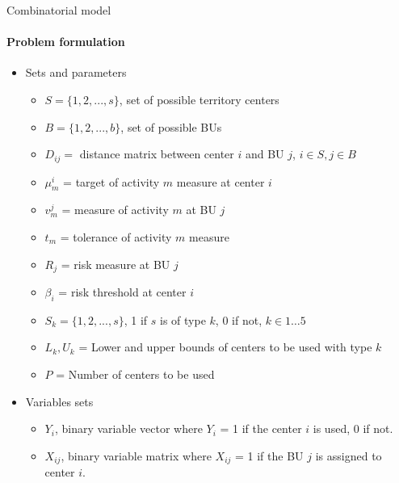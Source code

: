 \documentclass{beamer}
\begin{document}
\begin{frame}{Combinatorial model}
    \framesubtitle{Problem formulation}
    \begin{itemize}
        \item Sets and parameters
        \begin{itemize}
            \item $S = \{1, 2, ..., s\}$, set of possible territory centers
            \item $B = \{1, 2, ..., b\}$, set of possible BUs
            \item $D_{ij} = $ distance matrix between center $i$ and BU $j$, $i \in S, j \in B$
            \item $\mu_m^i$ = target of activity $m$ measure at center $i$
            \item $v_m^j$ = measure of activity $m$ at BU $j$
            \item $t_m$ = tolerance of activity $m$ measure
            \item $R_j$ = risk measure at BU $j$
            \item $\beta_i$ = risk threshold at center $i$
            \item $S_k = \{1,2,...,s\}$, 1 if $s$ is of type $k$, 0 if not, $k \in 1\ldots 5$
            \item $L_k, U_k$ = Lower and upper bounds of centers to be used with type $k$
            \item $P$ = Number of centers to be used
        \end{itemize}
        
        \item Variables sets
        \begin{itemize}
            \item \small $Y_i$, binary variable vector where $Y_i$ = 1 if the center $i$ is used, 0 if not.
            \item \small $X_{ij}$, binary variable matrix where $X_{ij}$ = 1 if the BU $j$ is assigned to center $i$.
        \end{itemize}
    \end{itemize}
\end{frame}
\end{document}

